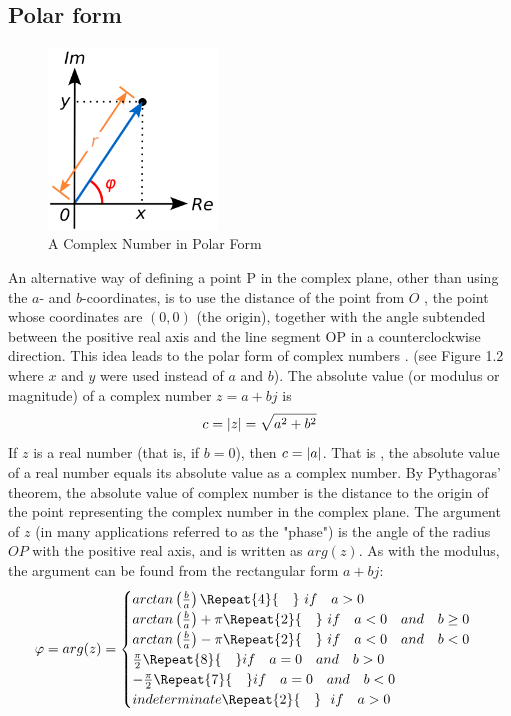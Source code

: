 \documentclass[12pt,oneside,openany]{memoir}
\numberwithin{equation}{subsection}
\DeclarePairedDelimiter{\abs}{\lvert}{\rvert}
\newcommand{\quads}[1]{\Repeat{#1}{\quad}}
\begin{document}
\subsection{Polar form}
\begin{figure}
    \centering
    \captionsetup{justification=centering}
    \includegraphics[width=0.4\textwidth]{images/complex_number_polar_form.png}
    \caption{A Complex Number in Polar Form}
\end{figure}
An alternative way of defining a point P in the complex plane, other than using
the \(a\)- and \(b\)-coordinates, is to use the distance of the point from \(O\)
, the point whose coordinates are \((0, 0)\) (the origin), together with the
angle subtended between the positive real axis and the line segment OP in a
counterclockwise direction. This idea leads to the polar form of complex numbers
. (see Figure 1.2 where \(x\) and \(y\) were used instead of \(a\) and \(b\)).
\bigbreak
The absolute value (or modulus or magnitude) of a complex number \(z = a + bj\)
is
\[c = \abs{z} = \sqrt{a^2 + b^2}\]
If \(z\) is a real number (that is, if \(b = 0\)), then \(c = \abs{a}\). That is
, the absolute value of a real number equals its absolute value as a complex
number. By Pythagoras' theorem, the absolute value of complex number is the
distance to the origin of the point representing the complex number in the
complex plane. 
\bigbreak
The argument of \(z\) (in many applications referred to as the "phase") is the
angle of the radius \(OP\) with the positive real axis, and is written as
\(arg(z)\). As with the modulus, the argument can be found from the rectangular
form \(a + bj\):
\[
	\varphi = arg(z) =
	\begin{cases}
		arctan\left(\frac{b}{a}\right) \quads{4} \ if \quad a > 0\\
		arctan\left(\frac{b}{a}\right) + \pi \quads{2} \ if \quad a < 0 
		\quad and \quad b \geq 0\\
		arctan\left(\frac{b}{a}\right) - \pi \quads{2} \ if \quad a < 0 
		\quad and \quad b < 0\\
		\frac{\pi}{2} \quads{8} if \quad a = 0 \quad and \quad b > 0\\
		-\frac{\pi}{2} \quads{7} if \quad a = 0 \quad and \quad b < 0\\
		indeterminate \quads{2} \ \ if \quad a > 0
	 \end{cases}
\]
\end{document}
